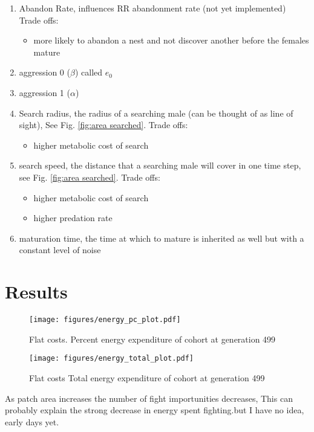 \documentclass[a4paper,11pt]{article}
\begin{document}
\begin{enumerate}
    \item Abandon Rate, influences RR abandonment rate (not yet implemented)
    Trade offs:
    \begin{itemize}
        \item more likely to abandon a nest and not discover another before the females mature
    \end{itemize}

    \item aggression 0 ($\beta$) called $e_0$
    \item aggression 1 ($\alpha$)
    
    \item Search radius, the radius of a searching male (can be thought of as line of sight), See Fig. \ref{fig:area searched}.
    Trade offs:
    \begin{itemize}
        \item higher metabolic cost of search
    \end{itemize}

    \item search speed, the distance that a searching male will cover in one time step, see Fig. \ref{fig:area searched}.
    Trade offs:
        \begin{itemize}
            \item higher metabolic cost of search
            \item higher predation rate
        \end{itemize}
    \item maturation time, the time at which to mature is inherited as well but with a constant level of noise
\end{enumerate}

\clearpage

\section{Results} %
\label{sec:results}

\begin{figure}[h!]
    \centering
    \texttt{[image: figures/energy\_pc\_plot.pdf]}
    \caption{Flat costs. Percent energy expenditure of cohort at generation 499}
    \label{fig:energy pc}

    \centering
    \texttt{[image: figures/energy\_total\_plot.pdf]}
    \caption{ Flat costs Total energy expenditure of cohort at generation 499}
    \label{fig:energy total}
\end{figure}
As patch area increases the number of fight importunities decreases,
This can probably explain the strong decrease in energy spent fighting.but I have no idea, early days yet.
\clearpage
\end{document}
